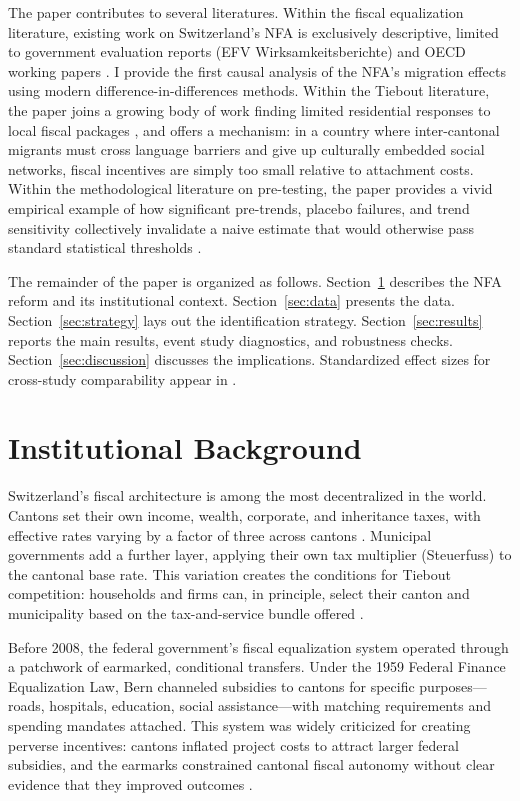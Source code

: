 \documentclass[12pt]{article}
\begin{document}
The paper contributes to several literatures. Within the fiscal equalization literature, existing work on Switzerland's NFA is exclusively descriptive, limited to government evaluation reports (EFV Wirksamkeitsberichte) and OECD working papers \citep{efv2014wirksamkeit}. I provide the first causal analysis of the NFA's migration effects using modern difference-in-differences methods. Within the Tiebout literature, the paper joins a growing body of work finding limited residential responses to local fiscal packages \citep{banzhaf2014gentrification, basten2017iscal}, and offers a mechanism: in a country where inter-cantonal migrants must cross language barriers and give up culturally embedded social networks, fiscal incentives are simply too small relative to attachment costs. Within the methodological literature on pre-testing, the paper provides a vivid empirical example of how significant pre-trends, placebo failures, and trend sensitivity collectively invalidate a naive estimate that would otherwise pass standard statistical thresholds \citep{rambachan2023more, freyaldenhoven2019pre}.

The remainder of the paper is organized as follows. Section~\ref{sec:background} describes the NFA reform and its institutional context. Section~\ref{sec:data} presents the data. Section~\ref{sec:strategy} lays out the identification strategy. Section~\ref{sec:results} reports the main results, event study diagnostics, and robustness checks. Section~\ref{sec:discussion} discusses the implications. Standardized effect sizes for cross-study comparability appear in .


\section{Institutional Background}
\label{sec:background}

Switzerland's fiscal architecture is among the most decentralized in the world. Cantons set their own income, wealth, corporate, and inheritance taxes, with effective rates varying by a factor of three across cantons \citep{kirchgassner2002effects}. Municipal governments add a further layer, applying their own tax multiplier (Steuerfuss) to the cantonal base rate. This variation creates the conditions for Tiebout competition: households and firms can, in principle, select their canton and municipality based on the tax-and-service bundle offered \citep{schmidheiny2006income}.

Before 2008, the federal government's fiscal equalization system operated through a patchwork of earmarked, conditional transfers. Under the 1959 Federal Finance Equalization Law, Bern channeled subsidies to cantons for specific purposes---roads, hospitals, education, social assistance---with matching requirements and spending mandates attached. This system was widely criticized for creating perverse incentives: cantons inflated project costs to attract larger federal subsidies, and the earmarks constrained cantonal fiscal autonomy without clear evidence that they improved outcomes \citep{dafflon2004fiscal}.
\end{document}
